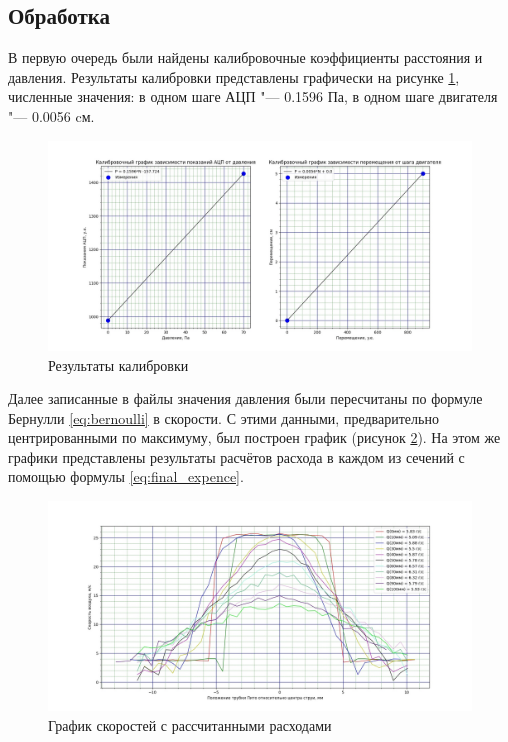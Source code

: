         \subsection*{Обработка}
            В первую очередь были найдены калибровочные коэффициенты расстояния и давления. Результаты калибровки представлены графически на рисунке \ref{fig:calibration}, численные значения: в одном шаге АЦП "--- 0.1596 Па, в одном шаге двигателя "--- 0.0056 cм.
            
            \begin{figure}[h]
                \centering
                \includegraphics[width=\textwidth]{../plots/calibration.jpg}
                \caption{Результаты калибровки}
                \label{fig:calibration}
            \end{figure}

            Далее записанные в файлы значения давления были пересчитаны по формуле Бернулли \ref{eq:bernoulli} в скорости. С этими данными, предварительно центрированными по максимуму, был построен график (рисунок \ref{fig:expence}). На этом же графики представлены результаты расчётов расхода в каждом из сечений с помощью формулы \ref{eq:final_expence}.

            \begin{figure}[h!]
                \centering
                \includegraphics[width=\textwidth]{../plots/expence.jpg}
                \caption{График скоростей с рассчитанными расходами}
                \label{fig:expence}
            \end{figure}

